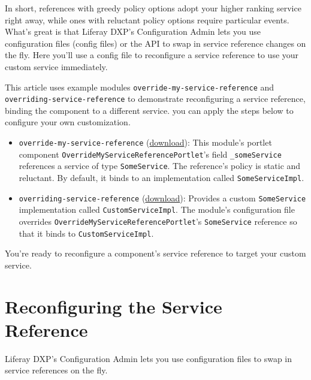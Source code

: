In short, references with greedy policy options adopt your higher
ranking service right away, while ones with reluctant policy options
require particular events. What's great is that Liferay DXP's
Configuration Admin lets you use configuration files (config files) or
the API to swap in service reference changes on the fly. Here you'll use
a config file to reconfigure a service reference to use your custom
service immediately.

This article uses example modules \texttt{override-my-service-reference}
and \texttt{overriding-service-reference} to demonstrate reconfiguring a
service reference, binding the component to a different service. you can
apply the steps below to configure your own customization.

\begin{itemize}
\item
  \texttt{override-my-service-reference}
  (\href{https://portal.liferay.dev/documents/113763090/114000186/override-my-service-reference.zip}{download}):
  This module's portlet component
  \texttt{OverrideMyServiceReferencePortlet}'s field
  \texttt{\_someService} references a service of type
  \texttt{SomeService}. The reference's policy is static and reluctant.
  By default, it binds to an implementation called
  \texttt{SomeServiceImpl}.
\item
  \texttt{overriding-service-reference}
  (\href{https://portal.liferay.dev/documents/113763090/114000186/overriding-service-reference.zip}{download}):
  Provides a custom \texttt{SomeService} implementation called
  \texttt{CustomServiceImpl}. The module's configuration file overrides
  \texttt{OverrideMyServiceReferencePortlet}'s \texttt{SomeService}
  reference so that it binds to \texttt{CustomServiceImpl}.
\end{itemize}

You're ready to reconfigure a component's service reference to target
your custom service.

\section{Reconfiguring the Service
Reference}\label{reconfiguring-the-service-reference}

Liferay DXP's Configuration Admin lets you use configuration files to
swap in service references on the fly.

